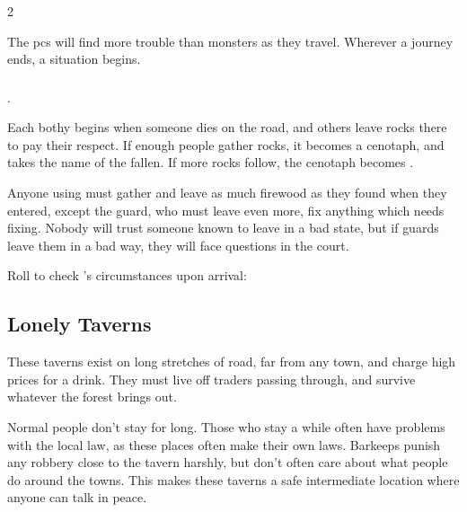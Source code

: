 \begin{multicols}{2}

\noindent
The \glspl{pc} will find more trouble than \glspl{monster} as they travel.
Wherever a journey ends, a situation begins.

\subsubsection{}
\label{bothyEvents}
.

Each \gls{bothy} begins when someone dies on the road, and others leave rocks there to pay their respect.
If enough people gather rocks, it becomes a cenotaph, and takes the name of the fallen.
If more rocks follow, the cenotaph becomes .

Anyone using  must gather and leave as much firewood as they found when they entered, except the \gls{guard}, who must leave even more, fix anything which needs fixing.
Nobody will trust someone known to leave  in a bad state, but if \glspl{guard} leave them in a bad way, they will face questions in the \gls{court}.

Roll to check 's circumstances upon arrival:

\bothyEvents

\needspace{18em}
\subsubsection{}
\label{villageEvents}

\encVillageEvent

\subsection{Lonely Taverns}
\label{lonelyTaverns}

These taverns exist on long stretches of road, far from any town, and
charge high prices for a drink. They must live off traders passing
through, and survive whatever the forest brings out.

Normal people don't stay for long.
Those who stay a while often have problems with the local
law, as these places often make their own laws.
Barkeeps punish any robbery close to the tavern harshly, but don't often care about what people do around the towns.
This makes these taverns a safe intermediate location where anyone can talk in peace.


\end{multicols}
